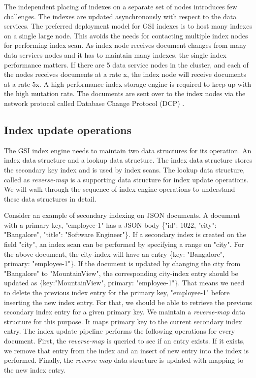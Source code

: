\documentclass{vldb}
\begin{document}
The independent placing of indexes on a separate set of nodes introduces few challenges. The indexes are updated asynchronously with respect to the data services. The preferred deployment model for GSI indexes is to host many indexes on a single large node. This avoids the needs for contacting multiple index nodes for performing index scan. As index node receives document changes from many data services nodes and it has to maintain many indexes, the single index performance matters. If there are 5 data service nodes in the cluster, and each of the nodes receives documents at a rate x, the index node will receive documents at a rate 5x. A high-performance index storage engine is required to keep up with the high mutation rate. The documents are sent over to the index nodes via the network protocol called Database Change Protocol (DCP) \cite{dcp}.

\subsection{Index update operations} 
The GSI index engine needs to maintain two data structures for its operation. An index data structure and a lookup data structure. The index data structure stores the secondary key index and is used by index scans. The lookup data structure, called as \textit{reverse-map} is a supporting data structure for index update operations. We will walk through the sequence of index engine operations to understand these data structures in detail.

Consider an example of secondary indexing on JSON documents. A document with a primary key, "employee-1" has a JSON body \{"id": 1022, "city": "Bangalore", "title": "Software Engineer"\}. If a secondary index is created on the field "city", an index scan can be performed by specifying a range on "city". For the above document, the city-index will have an entry \{key: "Bangalore", primary: "employee-1"\}. If the document is updated by changing the city from "Bangalore" to "MountainView",  the corresponding city-index entry should be updated as \{key:"MountainView", primary: "employee-1"\}. That means we need to delete the previous index entry for the primary key, "employee-1" before inserting the new index entry. For that, we should be able to retrieve the previous secondary index entry for a given primary key. We maintain a \textit{reverse-map} data structure for this purpose. It maps primary key to the current secondary index entry. The index update pipeline performs the following operations for every document. First, the \textit{reverse-map} is queried to see if an entry exists. If it exists, we remove that entry from the index and an insert of new entry into the index is performed. Finally, the \textit{reverse-map} data structure is updated with mapping to the new index entry.
\end{document}
